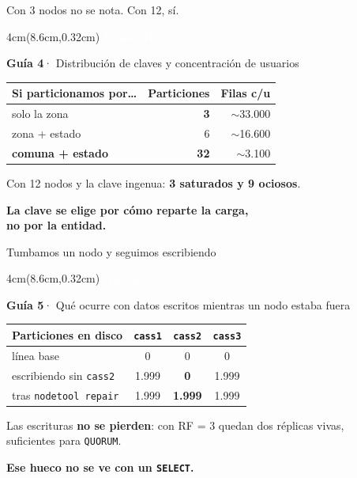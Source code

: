 \documentclass[aspectratio=169,11pt]{beamer}
\newcommand{\quien}[1]{%
  \begin{textblock*}{4cm}(8.6cm,0.32cm)
    \tiny\textcolor{white}{\textbf{#1}}
  \end{textblock*}}
\newcommand{\medido}[1]{\textcolor{cmVerde!70!black}{\textbf{#1}}}
\newcommand{\remate}[1]{%
  \vfill
  \begin{center}
  \begin{minipage}{0.88\textwidth}\centering
  \large\textcolor{cmVerde!65!black}{\textbf{#1}}
  \end{minipage}
  \end{center}
  \vspace{6pt}}
\newcommand{\guia}[2]{%
  \vspace{-5pt}
  \begingroup\scriptsize\raggedright
  \textcolor{cmVerde}{\textbf{Guía #1}}\;\textcolor{cmGris}{· #2}\par
  \endgroup
  \vspace{10pt}}
\begin{document}
\begin{frame}{Con 3 nodos no se nota. Con 12, sí.}
\quien{Elizabeth}
\guia{4}{Distribución de claves y concentración de usuarios}
\vspace{8pt}
\centering
\small
\begin{tabular}{@{}lrr@{}}
\toprule
\textbf{Si particionamos por…} & \textbf{Particiones} & \textbf{Filas c/u} \\
\midrule
solo la zona & \textcolor{cmRojo}{\textbf{3}} & $\sim$33.000 \\
zona + estado & 6 & $\sim$16.600 \\
\textbf{comuna + estado} & \textcolor{cmVerde}{\textbf{32}} & $\sim$3.100 \\
\bottomrule
\end{tabular}

\vspace{12pt}
{\small\textcolor{cmGris}{Con 12 nodos y la clave ingenua:
\textbf{3 saturados y 9 ociosos}.}}

\remate{La clave se elige por cómo reparte la carga,\\[2pt]
\normalsize no por la entidad.}
\end{frame}

\begin{frame}{Tumbamos un nodo y seguimos escribiendo}
\quien{Nilton}
\guia{5}{Qué ocurre con datos escritos mientras un nodo estaba fuera}
\vspace{6pt}
\centering
\small
\begin{tabular}{@{}lccc@{}}
\toprule
\textbf{Particiones en disco} & \texttt{cass1} & \texttt{cass2} & \texttt{cass3} \\
\midrule
línea base & 0 & 0 & 0 \\
escribiendo sin \texttt{cass2} & 1.999 & \textcolor{cmRojo}{\textbf{0}} & 1.999 \\
tras \texttt{nodetool repair} & 1.999 & \medido{1.999} & 1.999 \\
\bottomrule
\end{tabular}

\vspace{12pt}
{\small\textcolor{cmGris}{Las escrituras \textbf{no se pierden}: con RF = 3 quedan
dos réplicas vivas,\\ suficientes para \texttt{QUORUM}.}}

\remate{Ese hueco no se ve con un \texttt{SELECT}.}
\end{frame}
\end{document}
